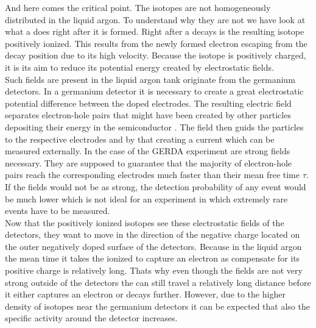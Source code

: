 And here comes the critical point.
The  isotopes are not homogeneously distributed in the liquid argon.
To understand why they are not we have look at what a  does right after it is formed.
Right after a  decays is the resulting  isotope positively ionized.
This results from the newly formed electron escaping from the decay position due to its high velocity.
Because the  isotope is positively charged, it is its aim to reduce its potential energy created by electrostatic fields.
\\

Such fields are present in the liquid argon tank originate from the germanium detectors.
In a germanium detector it is necessary to create a great electrostatic potential difference between the doped electrodes.
The resulting electric field separates electron-hole pairs that might have been created by other particles depositing their energy in the semiconductor \cite{spieler_semiconductor_2005}.
The field then guids the particles to the respective electrodes and by that creating a current which can be measured externally.
In the case of the GERDA experiment are strong fields necessary.
They are supposed to guarantee that the majority of electron-hole pairs reach the corresponding electrodes much faster than their mean free time $\tau$. %
If the fields would not be as strong, the detection probability of any event would be much lower which is not ideal for an experiment in which extremely rare events have to be measured.
\\

Now that the positively ionized isotopes see these electrostatic fields of the detectors, they want to move in the direction of the negative charge located on the outer negatively doped surface of the detectors.
Because in the liquid argon the mean time it takes the ionized  to capture an electron as compensate for its positive charge is relatively long. %
Thats why even though the fields are not very strong outside of the detectors the  can still travel a relatively long distance before it either captures an electron or decays further. 
However, due to the higher density of  isotopes near the germanium detectors it can be expected that also the specific activity around the detector increases.
\\

